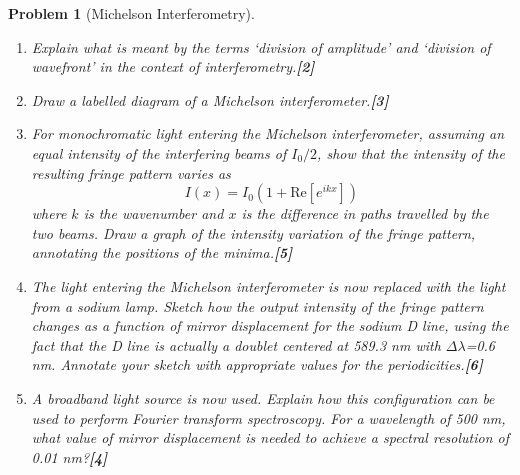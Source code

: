 \documentclass[a4paper]{article}
\theoremstyle{new}
\newtheorem{qns}{Problem}[subsection]
\begin{document}
\begin{qns}[Michelson Interferometry]\leavevmode
\begin{enumerate}[label=(\alph*)]
\item Explain what is meant by the terms ‘division of amplitude’ and ‘division of wavefront’ in the context of interferometry.\hfill\textbf{[2]}
\item Draw a labelled diagram of a Michelson interferometer.\hfill\textbf{[3]}
\item For monochromatic light entering the Michelson interferometer, assuming an equal intensity of the interfering beams of $I_0/2$, show that the intensity of the resulting fringe pattern varies as
$$I(x)=I_0(1+\text{Re}[e^{ikx}])$$
where $k$ is the wavenumber and $x$ is the difference in paths travelled by the two beams. Draw a graph of the intensity variation of the fringe pattern, annotating the positions of the minima.\hfill\textbf{[5]}
\item The light entering the Michelson interferometer is now replaced with the light from a sodium lamp. Sketch how the output intensity of the fringe pattern changes as a function of mirror displacement for the sodium D line, using the fact that the D line is actually a doublet centered at 589.3 nm with $\Delta\lambda$=0.6 nm. Annotate your sketch with appropriate values for the periodicities.\hfill\textbf{[6]}
\item A broadband light source is now used. Explain how this configuration can be used to perform Fourier transform spectroscopy. For a wavelength of 500 nm, what value of mirror displacement is needed to achieve a spectral resolution of 0.01 nm?\hfill\textbf{[4]}
\end{enumerate}
\end{qns}
\end{document}
